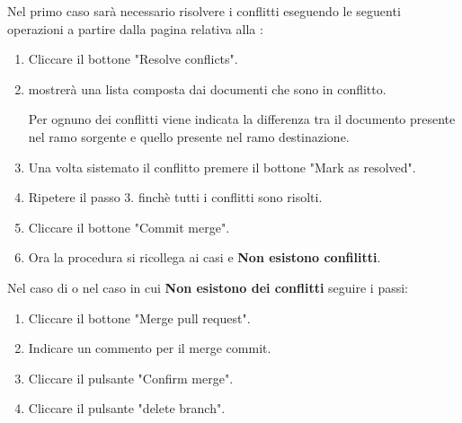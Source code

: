 \begin{enumerate}
    Nel primo caso sarà necessario risolvere i conflitti eseguendo le seguenti operazioni a partire dalla pagina relativa alla :
    \begin{enumerate}
        \item Cliccare il bottone "Resolve conflicts".
        \item {} mostrerà una lista composta dai documenti che sono in conflitto.
        
        Per ognuno dei conflitti viene indicata la differenza tra il documento presente nel ramo sorgente e quello presente nel ramo destinazione.

        \item Una volta sistemato il conflitto premere il bottone "Mark as resolved".
        
        \item Ripetere il passo 3. finchè tutti i conflitti sono risolti.
        
        \item Cliccare il bottone "Commit merge".
        
        \item Ora la procedura si ricollega ai casi \textbf{} e \textbf{Non esistono confilitti}.
    \end{enumerate}    

    Nel caso di \textbf{} o nel caso in cui \textbf{Non esistono dei conflitti} seguire i passi:
    \begin{enumerate}
        \item Cliccare il bottone "Merge pull request".
        \item Indicare un commento per il merge commit.
        \item Cliccare il pulsante "Confirm merge".
        \item Cliccare il pulsante "delete branch".
    \end{enumerate}
\end{enumerate}


